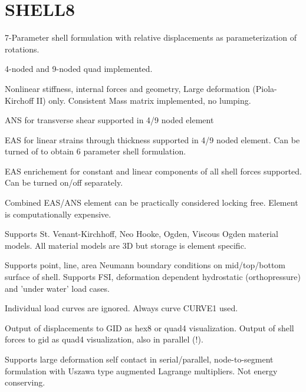 



\chapter{SHELL8}
7-Parameter shell formulation with relative displacements as parameterization of
rotations. 

\subitempart{} 
4-noded and 9-noded quad implemented.

\subitempart{} 
Nonlinear stiffness, internal forces and geometry, Large deformation (Piola-Kirchoff II) only.
Consistent Mass matrix implemented, no lumping.

\subitempart{} 
ANS for transverse shear supported in 4/9 noded element

\subitempart{} 
EAS for linear strains through thickness supported in 4/9 noded element.
Can be turned of to obtain 6 parameter shell formulation.

\subitempart{} 
EAS enrichement for constant and linear components of all shell forces supported.
Can be turned on/off separately.

\subitempart{} 
Combined EAS/ANS element can be practically considered locking free.
Element is computationally expensive.

\subitempart{} 
Supports St. Venant-Kirchhoff, Neo Hooke, Ogden, Viscous Ogden material models.
All material models are 3D but storage is element specific.

\subitempart{} 
Supports point, line, area Neumann boundary conditions on mid/top/bottom surface
of shell. Supports FSI, deformation dependent hydrostatic (orthopressure) and 'under water' load cases.

\subitempart{} 
Individual load curves are ignored. Always curve CURVE1 used.

\subitempart{} 
Output of displacements to GID as hex8 or quad4 visualization. Output of shell forces
to gid as quad4 visualization, also in parallel (!).

\subitempart{} 
Supports large deformation self contact in serial/parallel, node-to-segment formulation
with Uszawa type augmented Lagrange multipliers. Not energy conserving.
